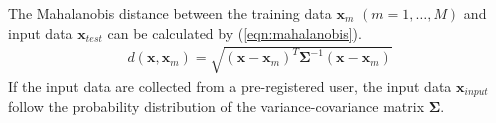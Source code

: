 \documentclass[sigchi,authordraft]{acmart}
\begin{document}
The Mahalanobis distance between the training data $\bm{x}_m$ $(m=1,\dots, M)$ and input data $\bm{x}_{test}$ can be calculated by (\ref{eqn:mahalanobis}).
\begin{eqnarray}
\label{eqn:mahalanobis}
  d(\bm{x},\bm{x}_m) = \sqrt{(\bm{x}-\bm{x}_m)^{T}\bm{\Sigma}^{-1}(\bm{x}-\bm{x}_m)}
\end{eqnarray}
If the input data are collected from a pre-registered user, the input data $\bm{x}_{input}$ follow the probability distribution of the variance-covariance matrix $\bm{\Sigma}$.




\end{document}
